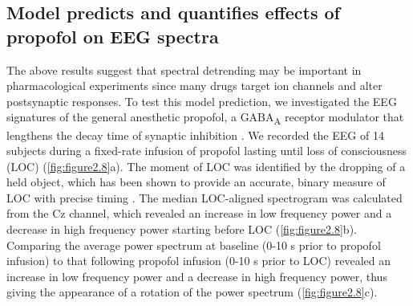 \subsection{Model predicts and quantifies effects of propofol on EEG spectra}
The above results suggest that spectral detrending may be important in pharmacological experiments since many drugs target ion channels and alter postsynaptic responses. To test this model prediction, we investigated the EEG signatures of the general anesthetic propofol, a GABA\textsubscript{A} receptor modulator that lengthens the decay time of synaptic inhibition \cite{Franks2008, Kitamura2003, Orser1994, Whittington1996}. We recorded the EEG of 14 subjects during a fixed-rate infusion of propofol lasting until loss of consciousness (LOC) (\autoref{fig:figure2.8}a). The moment of LOC was identified by the dropping of a held object, which has been shown to provide an accurate, binary measure of LOC with precise timing \cite{Cummings1984,Guay2019}. The median LOC-aligned spectrogram was calculated from the Cz channel, which revealed an increase in low frequency power and a decrease in high frequency power starting before LOC (\autoref{fig:figure2.8}b). Comparing the average power spectrum at baseline (0-10 \unit{\second} prior to propofol infusion) to that following propofol infusion (0-10 \unit{\second} prior to LOC) revealed an increase in low frequency power and a decrease in high frequency power, thus giving the appearance of a rotation of the power spectrum (\autoref{fig:figure2.8}c). 

